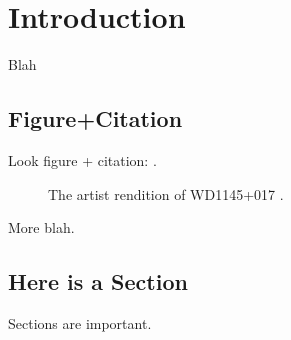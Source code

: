 \chapter{Introduction}


Blah

\section{Figure+Citation}

Look figure + citation: \citep[e.g.,][see Fig. \ref{PrettyPic}]{Vanderburg2015}. 

\begin{figure}
\centering
{}
\caption{The artist rendition of WD1145+017 \citep[from][]{Vanderburg2015}.}
\label{PrettyPic}
\end{figure}

More blah.

\section{Here is a Section}
Sections are important.

